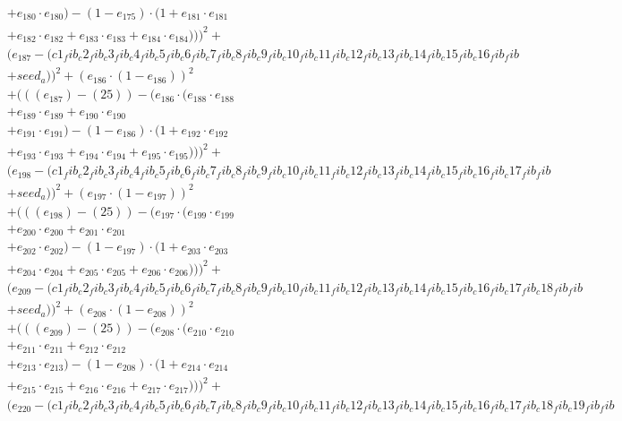\documentclass[10pt, a4paper]{article}
\begin{document}
\begin{align*}
& + e_{180} \cdot e_{180}) - (1 - e_{175}) \cdot (1 + e_{181} \cdot e_{181} \\
& + e_{182} \cdot e_{182} + e_{183} \cdot e_{183} + e_{184} \cdot e_{184})))^{2} + \\
& (e_{187} - (c1_fib_c2_fib_c3_fib_c4_fib_c5_fib_c6_fib_c7_fib_c8_fib_c9_fib_c10_fib_c11_fib_c12_fib_c13_fib_c14_fib_c15_fib_c16_fib_fib \\
& + seed_a))^{2} + (e_{186} \cdot (1 - e_{186}))^{2} \\
& + (((e_{187}) - (25)) - (e_{186} \cdot (e_{188} \cdot e_{188} \\
& + e_{189} \cdot e_{189} + e_{190} \cdot e_{190} \\
& + e_{191} \cdot e_{191}) - (1 - e_{186}) \cdot (1 + e_{192} \cdot e_{192} \\
& + e_{193} \cdot e_{193} + e_{194} \cdot e_{194} + e_{195} \cdot e_{195})))^{2} + \\
& (e_{198} - (c1_fib_c2_fib_c3_fib_c4_fib_c5_fib_c6_fib_c7_fib_c8_fib_c9_fib_c10_fib_c11_fib_c12_fib_c13_fib_c14_fib_c15_fib_c16_fib_c17_fib_fib \\
& + seed_a))^{2} + (e_{197} \cdot (1 - e_{197}))^{2} \\
& + (((e_{198}) - (25)) - (e_{197} \cdot (e_{199} \cdot e_{199} \\
& + e_{200} \cdot e_{200} + e_{201} \cdot e_{201} \\
& + e_{202} \cdot e_{202}) - (1 - e_{197}) \cdot (1 + e_{203} \cdot e_{203} \\
& + e_{204} \cdot e_{204} + e_{205} \cdot e_{205} + e_{206} \cdot e_{206})))^{2} + \\
& (e_{209} - (c1_fib_c2_fib_c3_fib_c4_fib_c5_fib_c6_fib_c7_fib_c8_fib_c9_fib_c10_fib_c11_fib_c12_fib_c13_fib_c14_fib_c15_fib_c16_fib_c17_fib_c18_fib_fib \\
& + seed_a))^{2} + (e_{208} \cdot (1 - e_{208}))^{2} \\
& + (((e_{209}) - (25)) - (e_{208} \cdot (e_{210} \cdot e_{210} \\
& + e_{211} \cdot e_{211} + e_{212} \cdot e_{212} \\
& + e_{213} \cdot e_{213}) - (1 - e_{208}) \cdot (1 + e_{214} \cdot e_{214} \\
& + e_{215} \cdot e_{215} + e_{216} \cdot e_{216} + e_{217} \cdot e_{217})))^{2} + \\
& (e_{220} - (c1_fib_c2_fib_c3_fib_c4_fib_c5_fib_c6_fib_c7_fib_c8_fib_c9_fib_c10_fib_c11_fib_c12_fib_c13_fib_c14_fib_c15_fib_c16_fib_c17_fib_c18_fib_c19_fib_fib \\

\end{align*}
\end{document}
